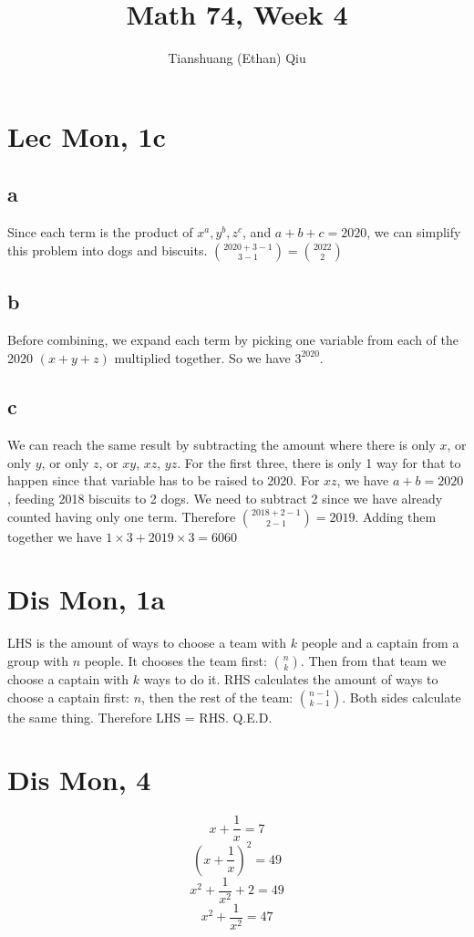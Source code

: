 \documentclass[12pt]{article}
\author{Tianshuang (Ethan) Qiu}
\begin{document}
\title{Math 74, Week 4}
\maketitle

\section{Lec Mon, 1c}
\subsection{a}
Since each term is the product of $x^a, y^b, z^c$, and $a+b+c = 2020$, we can simplify this problem into dogs and biscuits. $\binom{2020+3-1}{3-1} = \binom{2022}{2}$

\subsection{b}
Before combining, we expand each term by picking one variable from each of the 2020 $(x+y+z)$ multiplied together. So we have $3^2020$.

\subsection{c}
We can reach the same result by subtracting the amount where there is only $x$, or only $y$, or only $z$, or $xy$, $xz$, $yz$.
\newline
For the first three, there is only 1 way for that to happen since that variable has to be raised to 2020. For $xz$, we have $a+b = 2020$, feeding 2018 biscuits to 2 dogs. We need to subtract 2 since we have already counted having only one term. Therefore $\binom{2018+2-1}{2-1} = 2019$.
\newline
Adding them together we have $1 \times 3 + 2019 \times 3 = 6060$
\newpage


\section{Dis Mon, 1a}
LHS is the amount of ways to choose a team with $k$ people and a captain from a group with $n$ people. It chooses the team first: $\binom{n}{k}$. Then from that team we choose a captain with $k$ ways to do it.
\newline
RHS calculates the amount of ways to choose a captain first: $n$, then the rest of the team: $\binom{n-1}{k-1}$. Both sides calculate the same thing. Therefore LHS = RHS.
\newline
Q.E.D.

\section{Dis Mon, 4}
$$x+\frac{1}{x}=7$$
$$(x+\frac{1}{x})^2=49$$
$$x^2+\frac{1}{x^2}+2=49$$
$$x^2+\frac{1}{x^2}=47$$
\end{document}
